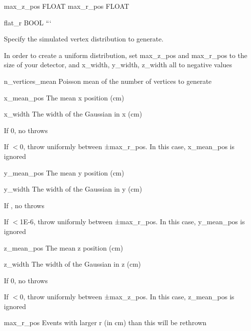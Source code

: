 max\-\_\-z\-\_\-pos F\-L\-O\-A\-T max\-\_\-r\-\_\-pos F\-L\-O\-A\-T

flat\-\_\-r B\-O\-O\-L ```

Specify the simulated vertex distribution to generate.

In order to create a uniform distribution, set {\ttfamily max\-\_\-z\-\_\-pos} and {\ttfamily max\-\_\-r\-\_\-pos} to the size of your detector, and {\ttfamily x\-\_\-width}, {\ttfamily y\-\_\-width}, {\ttfamily z\-\_\-width} all to negative values
\begin{DoxyItemize}
\item {\ttfamily n\-\_\-vertices\-\_\-mean} Poisson mean of the number of vertices to generate
\item {\ttfamily x\-\_\-mean\-\_\-pos} The mean {\ttfamily x} position (cm)
\item {\ttfamily x\-\_\-width} The width of the Gaussian in {\ttfamily x (cm)}
\begin{DoxyItemize}
\item If 0, no throws
\item If $<$0, throw uniformly between {\ttfamily ±max\-\_\-r\-\_\-pos}. In this case, {\ttfamily x\-\_\-mean\-\_\-pos} is ignored
\end{DoxyItemize}
\item {\ttfamily y\-\_\-mean\-\_\-pos} The mean {\ttfamily y} position (cm)
\item {\ttfamily y\-\_\-width} The width of the Gaussian in {\ttfamily y} (cm)
\begin{DoxyItemize}
\item If {}, no throws
\item If {\ttfamily $<$1\-E-\/6}, throw uniformly between {\ttfamily ±max\-\_\-r\-\_\-pos}. In this case, {\ttfamily y\-\_\-mean\-\_\-pos} is ignored
\end{DoxyItemize}
\item {\ttfamily z\-\_\-mean\-\_\-pos} The mean {\ttfamily z} position (cm)
\item {\ttfamily z\-\_\-width} The width of the Gaussian in {\ttfamily z} (cm)
\begin{DoxyItemize}
\item If 0, no throws
\item If $<$0, throw uniformly between {\ttfamily ±max\-\_\-z\-\_\-pos}. In this case, {\ttfamily z\-\_\-mean\-\_\-pos} is ignored
\end{DoxyItemize}
\item {\ttfamily max\-\_\-r\-\_\-pos} Events with larger {\ttfamily r} (in cm) than this will be rethrown

\end{DoxyItemize}
